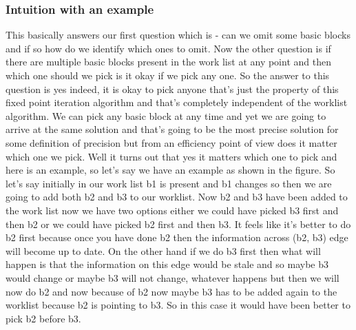 \subsubsection{Intuition with an example}
This basically answers our first question which is - can we omit some basic blocks and if so how do we identify which ones to omit. Now the other question is if there are multiple basic blocks present in the work list at any point and then which one should we pick is it okay if we pick any one. So the answer to this question is yes indeed, it is okay to pick anyone that's just the property of this fixed point iteration algorithm and that's completely independent of the worklist algorithm. We can pick any basic block at any time
and yet we are going to arrive at the same solution and that's going to be the most precise solution for some definition of precision but from an efficiency point of view
does it matter which one we pick. Well it turns out that yes it matters which one to pick and here is an example, so let's say we have an example as shown in the figure. So let's say initially in our work list b1 is present and b1 changes so then we are going to add both b2 and b3 to our worklist. Now b2 and b3 have been added to the
work list now we have two options either we could have picked b3 first and then b2 or we could have picked b2 first and then b3. It feels like it's better to do b2 first because once you have done b2 then the information across (b2, b3) edge will become up to date. On the other hand if we do b3 first then what will happen is that the information on this edge would be stale and so maybe b3 would change or maybe b3 will not change, whatever happens but then we will now do b2 and now because of b2 now maybe b3 has to be added again to the worklist because b2 is pointing to b3. So in this case it would have been better to pick b2 before b3. 

